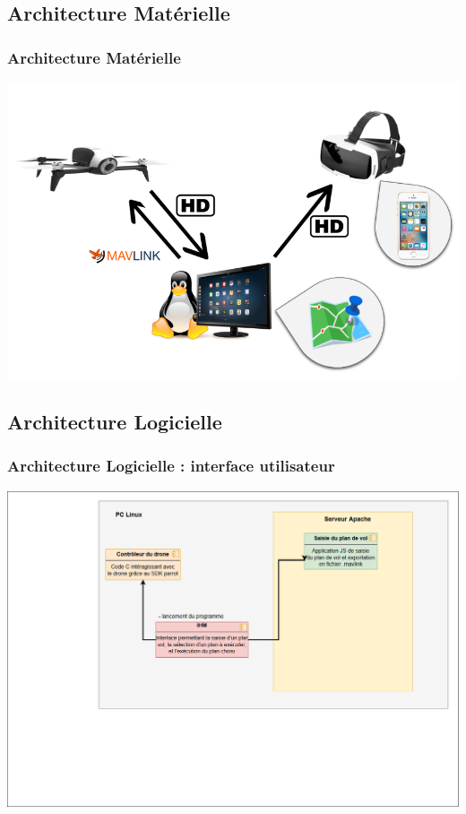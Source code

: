 \documentclass{beamer}
\begin{document}


	\begin{frame}
		\section{Architecture Matérielle}
		\begin{center}
		\frametitle{Architecture Matérielle}

        \includegraphics[scale=0.6]{archi_materielle.png}
		\end{center}
	\end{frame}
	


	\begin{frame}
	\section{Architecture Logicielle}
		\begin{center}
		\frametitle{Architecture Logicielle : interface utilisateur}

        \includegraphics[scale=0.24]{01_archi_logicielle_IHM.png}
		\end{center}
	\end{frame}
	
\end{document}
